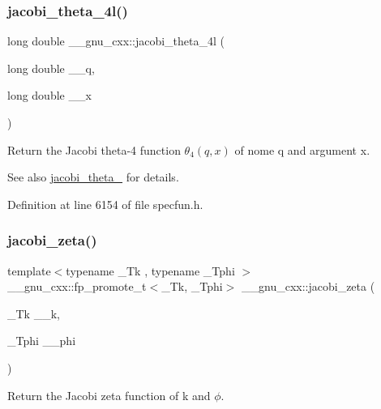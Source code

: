 \subsubsection{\texorpdfstring{jacobi\+\_\+theta\+\_\+4l()}{jacobi\_theta\_4l()}}
{\footnotesize\ttfamily long double \+\_\+\+\_\+gnu\+\_\+cxx\+::jacobi\+\_\+theta\+\_\+4l (\begin{DoxyParamCaption}\item[{long double}]{\+\_\+\+\_\+q,  }\item[{long double}]{\+\_\+\+\_\+x }\end{DoxyParamCaption})\hspace{0.3cm}{\ttfamily [inline]}}

Return the Jacobi theta-\/4 function $ \theta_4(q,x) $ of nome {\ttfamily q} and argument {\ttfamily x}.

\begin{DoxySeeAlso}{See also}
\hyperlink{group__mathsf__gnu_ga676501b6284d5702a3dc61252e6c78ab}{jacobi\+\_\+theta\+\_} for details. 
\end{DoxySeeAlso}


Definition at line 6154 of file specfun.\+h.

\mbox{\label{group__mathsf__gnu_ga639be4ebef9a20572375ec534be52b07}} 
\subsubsection{\texorpdfstring{jacobi\+\_\+zeta()}{jacobi\_zeta()}}
{\footnotesize\ttfamily template$<$typename \+\_\+\+Tk , typename \+\_\+\+Tphi $>$ \\
\+\_\+\+\_\+gnu\+\_\+cxx\+::fp\+\_\+promote\+\_\+t$<$\+\_\+\+Tk, \+\_\+\+Tphi$>$ \+\_\+\+\_\+gnu\+\_\+cxx\+::jacobi\+\_\+zeta (\begin{DoxyParamCaption}\item[{\+\_\+\+Tk}]{\+\_\+\+\_\+k,  }\item[{\+\_\+\+Tphi}]{\+\_\+\+\_\+phi }\end{DoxyParamCaption})\hspace{0.3cm}{\ttfamily [inline]}}

Return the Jacobi zeta function of {\ttfamily k} and $ \phi $.

